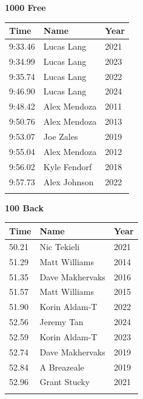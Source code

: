 \vspace{1.2em}
\noindent\begin{minipage}[t]{0.48\textwidth}
\centering
\textbf{\textcolor{teamprimary}{1000 Free}}\par
\vspace{0.5em}
\centering
\small
\renewcommand{\arraystretch}{1.0}
\setlength{\tabcolsep}{4pt}
\begin{tabular}{@{}p{1.8cm}p{3.0cm}p{1.0cm}@{}}
\toprule
\textbf{Time} & \textbf{Name} & \textbf{Year} \\
\midrule
9:33.46 & Lucas Lang & 2021 \\
9:34.99 & Lucas Lang & 2023 \\
9:35.74 & Lucas Lang & 2022 \\
9:46.90 & Lucas Lang & 2024 \\
9:48.42 & Alex Mendoza & 2011 \\
9:50.76 & Alex Mendoza & 2013 \\
9:53.07 & Joe Zales & 2019 \\
9:55.04 & Alex Mendoza & 2012 \\
9:56.02 & Kyle Fendorf & 2018 \\
9:57.73 & Alex Johnson & 2022 \\
\bottomrule
\vspace{0.5em}
\end{tabular}
\end{minipage}
\hfill
\begin{minipage}[t]{0.48\textwidth}
\centering
\textbf{\textcolor{teamprimary}{100 Back}}\par
\vspace{0.5em}
\centering
\small
\renewcommand{\arraystretch}{1.0}
\setlength{\tabcolsep}{4pt}
\begin{tabular}{@{}p{1.8cm}p{3.0cm}p{1.0cm}@{}}
\toprule
\textbf{Time} & \textbf{Name} & \textbf{Year} \\
\midrule
50.21 & Nic Tekieli & 2021 \\
51.29 & Matt Williams & 2014 \\
51.35 & Dave Makhervaks & 2016 \\
51.57 & Matt Williams & 2015 \\
51.90 & Korin Aldam-T & 2022 \\
52.56 & Jeremy Tan & 2024 \\
52.59 & Korin Aldam-T & 2023 \\
52.74 & Dave Makhervaks & 2019 \\
52.84 & A Breazeale & 2019 \\
52.96 & Grant Stucky & 2021 \\
\bottomrule
\vspace{0.5em}
\end{tabular}
\end{minipage}
